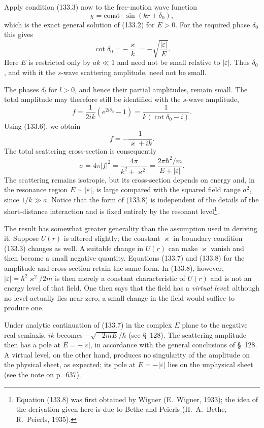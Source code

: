 Apply condition (133.3) now to the free-motion wave function
\[
 \chi=\mathrm{const}\cdot\sin(kr+\delta_0),
\]
which is the exact general solution of (133.2) for $E>0$. For the required phase $\delta_0$ this gives
\begin{equation}
 \cot\delta_0=-\frac{\varkappa}{k}=-\sqrt{\frac{|\varepsilon|}{E}}.
 \tag{133.6}
\end{equation}
Here $E$ is restricted only by $ak\ll1$ and need not be small relative to $|\varepsilon|$. Thus $\delta_0$, and with it the $s$-wave scattering amplitude, need not be small.

The phases $\delta_l$ for $l>0$, and hence their partial amplitudes, remain small. The total amplitude may therefore still be identified with the $s$-wave amplitude,
\[
 f=\frac1{2ik}(e^{2i\delta_0}-1)=\frac1{k(\cot\delta_0-i)}.
\]
Using (133.6), we obtain
\begin{equation}
 f=-\frac1{\varkappa+ik}.
 \tag{133.7}
\end{equation}
The total scattering cross-section is consequently
\begin{equation}
 \sigma=4\pi|f|^2=\frac{4\pi}{k^2+\varkappa^2}
 =\frac{2\pi\hbar^2/m}{E+|\varepsilon|}.
 \tag{133.8}
\end{equation}
The scattering remains isotropic, but its cross-section depends on energy and, in the resonance region $E\sim|\varepsilon|$, is large compared with the squared field range $a^2$, since $1/k\gg a$. Notice that the form of (133.8) is independent of the details of the short-distance interaction and is fixed entirely by the resonant level\footnote{Equation (133.8) was first obtained by Wigner (E.~Wigner, 1933); the idea of the derivation given here is due to Bethe and Peierls (H.~A.~Bethe, R.~Peierls, 1935).}.

The result has somewhat greater generality than the assumption used in deriving it. Suppose $U(r)$ is altered slightly; the constant $\varkappa$ in boundary condition (133.3) changes as well. A suitable change in $U(r)$ can make $\varkappa$ vanish and then become a small negative quantity. Equations (133.7) and (133.8) for the amplitude and cross-section retain the same form. In (133.8), however, $|\varepsilon|=\hbar^2\varkappa^2/2m$ is then merely a constant characteristic of $U(r)$ and is not an energy level of that field. One then says that the field has a \emph{virtual level}: although no level actually lies near zero, a small change in the field would suffice to produce one.

Under analytic continuation of (133.7) in the complex $E$ plane to the negative real semiaxis, $ik$ becomes $-\sqrt{-2mE}/\hbar$ (see \S~128). The scattering amplitude then has a pole at $E=-|\varepsilon|$, in accordance with the general conclusions of \S~128. A virtual level, on the other hand, produces no singularity of the amplitude on the physical sheet, as expected; its pole at $E=-|\varepsilon|$ lies on the unphysical sheet (see the note on p.~637).

